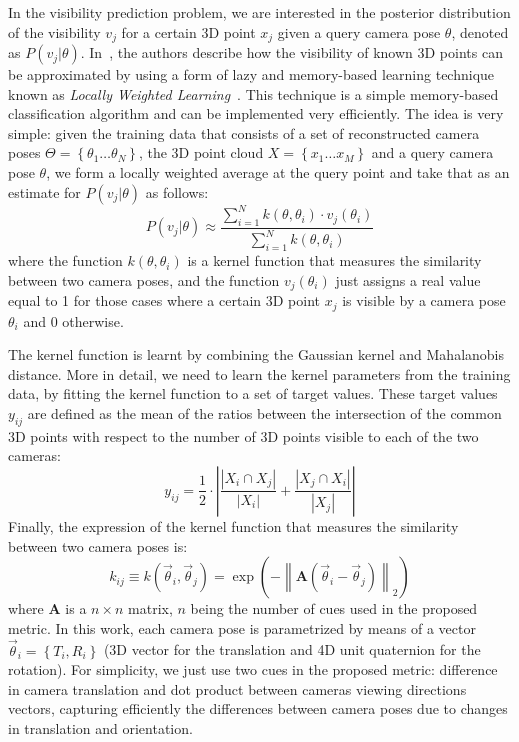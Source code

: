 In the visibility prediction problem, we are interested in the
posterior distribution of the visibility $v_{j}$ for a certain 3D
point $x_{j}$ given a query camera pose $\theta$, denoted as $P(v_{j}
\vert \theta)$. In~\cite{Alcantarilla11icra}, the authors describe how
the visibility of known 3D points can be approximated by using a form
of lazy and memory-based learning technique known as \textit{Locally
  Weighted Learning}~\cite{Atkeson97ai}. This technique is a simple
memory-based classification algorithm and can be implemented very
efficiently. The idea is very simple: given the training data that
consists of a set of reconstructed camera poses $\Theta =
\left\{\theta_1 \ldots \theta_N \right\}$, the 3D point cloud $X =
\left\{x_1 \ldots x_M\right\}$ and a query camera pose $\theta$, we
form a locally weighted average at the query point and take that as an
estimate for $P(v_{j} \vert \theta)$ as follows:
%
\begin{equation} \label{eq:locally_weighted}
 P(v_j \vert \theta) \approx \frac{\sum\limits_{i=1}^{N} k(\theta,\theta_{i})\cdot v_j(\theta_i)}{\sum\limits_{i=1}^{N} k(\theta,\theta_{i})}
\end{equation}
%
where the function $k(\theta,\theta_{i})$ is a kernel function that
measures the similarity between two camera poses, and the function
$v_{j}(\theta_i)$ just assigns a real value equal to 1 for those cases
where a certain 3D point $x_{j}$ is visible by a camera pose
$\theta_{i}$ and 0 otherwise.

The kernel function is learnt by combining the Gaussian kernel and
Mahalanobis distance. More in detail, we need to learn the kernel
parameters from the training data, by fitting the kernel function to a
set of target values. These target values $y_{ij}$ are defined as the
mean of the ratios between the intersection of the common 3D points
with respect to the number of 3D points visible to each of the two
cameras:
%
\begin{equation}\label{eq:similarity_weighted}
y_{ij} = \frac{1}{2}\cdot \left| \frac{\left|X_i \cap X_j \right|}{\left|X_i\right|} + \frac{\left|X_j \cap X_i\right|}{\left|X_j\right|} \right|
\end{equation}
%
Finally, the expression of the kernel function that measures the
similarity between two camera poses is:
%
\begin{equation}\label{eq:visibility_metric}
 k_{ij} \equiv k(\vec{\theta}_i,\vec{\theta}_j) =\exp\left(-\left\| \mathbf{A}(\vec{\theta}_i-\vec{\theta}_j)\right\|_{2}\right)
\end{equation}
%
where $\mathbf{A}$ is a $n \times n$ matrix, $n$ being the number of
cues used in the proposed metric. In this work, each camera pose is
parametrized by means of a vector $\vec{\theta}_i =
\left\{T_{i},R_{i}\right\}$ (3D vector for the translation and 4D unit
quaternion for the rotation). For simplicity, we just use two cues in
the proposed metric: difference in camera translation and dot product
between cameras viewing directions vectors, capturing efficiently the
differences between camera poses due to changes in translation and
orientation.

